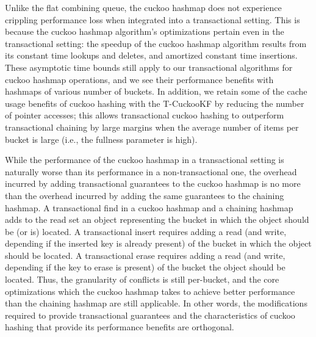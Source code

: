Unlike the flat combining queue, the cuckoo hashmap does not experience crippling performance loss when integrated into a transactional setting. This is because the cuckoo hashmap algorithm's optimizations pertain even in the transactional setting: the speedup of the cuckoo hashmap algorithm results from its constant time lookups and deletes, and amortized constant time insertions. These asymptotic time bounds still apply to our transactional algorithms for cuckoo hashmap operations, and we see their performance benefits with hashmaps of various number of buckets. In addition, we retain some of the cache usage benefits of cuckoo hashing with the T-CuckooKF by reducing the number of pointer accesses; this allows transactional cuckoo hashing to outperform transactional chaining by large margins when the average number of items per bucket is large (i.e., the fullness parameter is high). 

While the performance of the cuckoo hashmap in a transactional setting is naturally worse than its performance in a non-transactional one, the overhead incurred by adding transactional guarantees to the cuckoo hashmap is no more than the overhead incurred by adding the same guarantees to the chaining hashmap. 
A transactional find in a cuckoo hashmap and a chaining hashmap adds to the read set an object representing the bucket in which the object should be (or is) located.  A transactional insert requires adding a read (and write, depending if the inserted key is already present) of the bucket in which the object should be located. A transactional erase requires adding a read (and write, depending if the key to erase is present) of the bucket the object should be located. Thus, the granularity of conflicts is still per-bucket, and the core optimizations which the cuckoo hashmap takes to achieve better performance than the chaining hashmap are still applicable. In other words, the modifications required to provide transactional guarantees and the characteristics of cuckoo hashing that provide its performance benefits are orthogonal.
